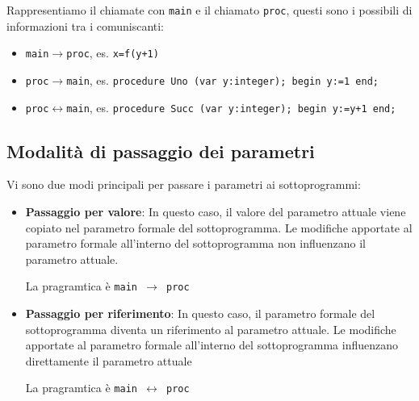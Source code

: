 
Rappresentiamo il chiamate con \texttt{main} e il chiamato \texttt{proc}, questi sono i possibili di informazioni tra i comuniscanti:
\begin{itemize}
    \item \texttt{main}$\to$\texttt{proc}, es. \texttt{x=f(y+1)}
    \item \texttt{proc}$\to$\texttt{main}, es. \texttt{procedure Uno (var y:integer); begin y:=1 end;}
    \item \texttt{proc}$\leftrightarrow$\texttt{main}, es. \texttt{procedure Succ (var y:integer); begin y:=y+1 end;}
\end{itemize}



\subsection{Modalità di passaggio dei parametri}
Vi sono due modi principali per passare i parametri ai sottoprogrammi:

\begin{itemize}
    \item \textbf{Passaggio per valore}: In questo caso, il valore del parametro attuale viene copiato nel parametro formale del sottoprogramma. Le modifiche apportate al parametro formale all'interno del sottoprogramma non influenzano il parametro attuale.
    
    La pragramtica è \texttt{main $\to$ proc}


    \item \textbf{Passaggio per riferimento}: In questo caso, il parametro formale del sottoprogramma diventa un riferimento al parametro attuale. Le modifiche apportate al parametro formale all'interno del sottoprogramma influenzano direttamente il parametro attuale
    
    La pragramtica è \texttt{main $\leftrightarrow$ proc}
    
\end{itemize}

